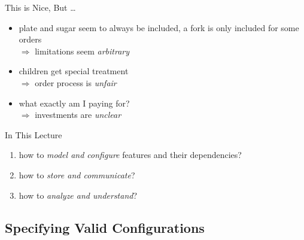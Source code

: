 \begin{frame}{\myframetitle}
	\begin{fancycolumns}[columns=3,widths={40,20,40}]
		\nextcolumn
		\nextcolumn
		\begin{note}{This is Nice, But \ldots}
			\begin{itemize}
				\item plate and sugar seem to always be included, a fork is only included for some orders\\
					$\Rightarrow$ limitations seem \emph{arbitrary}
				\item children get special treatment\\
					$\Rightarrow$ order process is \emph{unfair}
				\item what exactly am I paying for?\\
					$\Rightarrow$ investments are \emph{unclear}
			\end{itemize}
		\end{note}
		\begin{definition}{In This Lecture}
			\begin{enumerate}
				\item how to \emph{model and configure} features and their dependencies?
				\item how to \emph{store and communicate}?
				\item how to \emph{analyze and understand}?
			\end{enumerate}
		\end{definition}
	\end{fancycolumns}
\end{frame}

\subsection{Specifying Valid Configurations}

\newcommand{\feat}[1]{{\emph{#1}}}
\newcommand{\exampleFeatureSetConfigDB}{
	\vspace*{-4ex}
	\begin{align*}
		\text{Feature set } F = \{&\textbf{C}onfigDB, \textbf{G}et, \textbf{P}ut, \textbf{D}elete,\\
		&\textbf{T}ransactions, \textbf{W}indows, \textbf{L}inux\}
	\end{align*}
}

